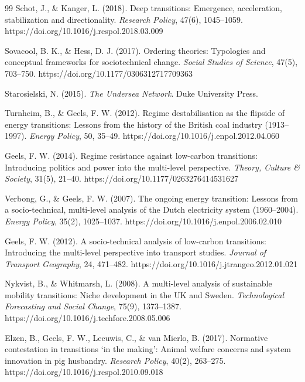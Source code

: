 \documentclass[review]{elsarticle}
\begin{document}
\begin{thebibliography}{99}
Schot, J., \& Kanger, L. (2018). Deep transitions: Emergence, acceleration, stabilization and directionality. \textit{Research Policy}, 47(6), 1045--1059. https://doi.org/10.1016/j.respol.2018.03.009

Sovacool, B. K., \& Hess, D. J. (2017). Ordering theories: Typologies and conceptual frameworks for sociotechnical change. \textit{Social Studies of Science}, 47(5), 703--750. https://doi.org/10.1177/0306312717709363

Starosielski, N. (2015). \textit{The Undersea Network}. Duke University Press.

Turnheim, B., \& Geels, F. W. (2012). Regime destabilisation as the flipside of energy transitions: Lessons from the history of the British coal industry (1913--1997). \textit{Energy Policy}, 50, 35--49. https://doi.org/10.1016/j.enpol.2012.04.060

Geels, F. W. (2014). Regime resistance against low-carbon transitions: Introducing politics and power into the multi-level perspective. \textit{Theory, Culture \& Society}, 31(5), 21--40. https://doi.org/10.1177/0263276414531627

Verbong, G., \& Geels, F. W. (2007). The ongoing energy transition: Lessons from a socio-technical, multi-level analysis of the Dutch electricity system (1960--2004). \textit{Energy Policy}, 35(2), 1025--1037. https://doi.org/10.1016/j.enpol.2006.02.010

Geels, F. W. (2012). A socio-technical analysis of low-carbon transitions: Introducing the multi-level perspective into transport studies. \textit{Journal of Transport Geography}, 24, 471--482. https://doi.org/10.1016/j.jtrangeo.2012.01.021

Nykvist, B., \& Whitmarsh, L. (2008). A multi-level analysis of sustainable mobility transitions: Niche development in the UK and Sweden. \textit{Technological Forecasting and Social Change}, 75(9), 1373--1387. https://doi.org/10.1016/j.techfore.2008.05.006

Elzen, B., Geels, F. W., Leeuwis, C., \& van Mierlo, B. (2017). Normative contestation in transitions `in the making': Animal welfare concerns and system innovation in pig husbandry. \textit{Research Policy}, 40(2), 263--275. https://doi.org/10.1016/j.respol.2010.09.018


\end{thebibliography}
\end{document}
